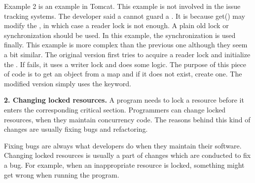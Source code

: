 


Example 2 is an example in Tomcat. This example is not involved in the issue tracking systems. The developer said a  cannot guard a . It is because get() may modify the , in which case a reader lock is not enough. A plain old lock or synchronization should be used. In this example, the synchronization is used finally. This example is more complex than the previous one although they seem a bit similar. The original version first tries to acquire a reader lock and initialize the . If fails, it uses a writer lock and does some logic. The purpose of this piece of code is to get an object from a map and if it does not exist, create one. The modified version simply uses the  keyword.%


 
\noindent 
\textbf{2. Changing locked resources.} A program needs to lock a resource before it enters the corresponding critical section. Programmers can change locked resources, when they maintain concurrency code. The reasons behind this kind of changes are usually fixing bugs and refactoring.%

Fixing bugs are always what developers do when they maintain their software. Changing locked resources is usually a part of changes which are conducted to fix a bug. For example, when an inappropriate resource is locked, something might get wrong when running the program.

